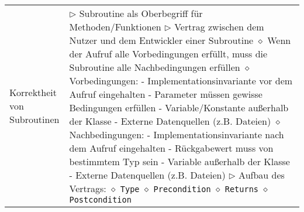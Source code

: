 \begin{longtable}{ | p{} p{} | }
	\makecell[l]{Korrektheit von \\ Subroutinen} & \makecell[l]{
	$\triangleright$ Subroutine als Oberbegriff für Methoden/Funktionen \\
	$\triangleright$ Vertrag zwischen dem Nutzer und dem Entwickler einer Subroutine \\
	\hspace{0.4cm} $\diamond$ Wenn der Aufruf alle Vorbedingungen erfüllt, \\
	\hspace{0.8cm} muss die Subroutine alle Nachbedingungen erfüllen \\
	\hspace{0.4cm} $\diamond$ Vorbedingungen: \\
	\hspace{0.6cm} - Implementationsinvariante vor dem Aufruf eingehalten \\
	\hspace{0.6cm} - Parameter müssen gewisse Bedingungen erfüllen \\
	\hspace{0.6cm} - Variable/Konstante au\ss erhalb der Klasse \\
	\hspace{0.6cm} - Externe Datenquellen (z.B. Dateien) \\
	\hspace{0.4cm} $\diamond$ Nachbedingungen: \\
	\hspace{0.6cm} - Implementationsinvariante nach dem Aufruf eingehalten \\
	\hspace{0.6cm} - Rückgabewert muss von bestimmtem Typ sein \\
	\hspace{0.6cm} - Variable au\ss erhalb der Klasse \\
	\hspace{0.6cm} - Externe Datenquellen (z.B. Dateien) \\
	$\triangleright$ Aufbau des Vertrags: \\
	\hspace{0.4cm} $\diamond$ \texttt{Type} \\
	\hspace{0.4cm} $\diamond$ \texttt{Precondition} \\
	\hspace{0.4cm} $\diamond$ \texttt{Returns} \\
	\hspace{0.4cm} $\diamond$ \texttt{Postcondition} \\
}
\end{longtable}
